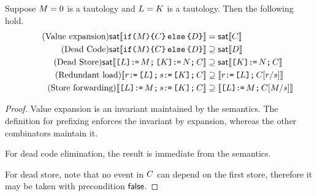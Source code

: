 \begin{lemma}
  Suppose $\aExp=0$ is a tautology and $\cExp=\dExp$ is a tautology.   Then the following hold.
  \begin{align*}
\tag{Value expansion}
  \fsat\sem{\IF{\aExp}\THEN\aCmd\ELSE\bCmd\FI} &=
  \fsat\sem{\aCmd}  \\
  \tag{Dead Code} 
  \fsat\sem{\IF{\aExp}\THEN\aCmd\ELSE\bCmd\FI} &\supseteq 
  \fsat\sem{\bCmd} \\
  \tag{Dead Store} 
  \fsat\sem{\REF{\cExp} \GETS \aExp \SEMI \REF{\dExp} \GETS \bExp \SEMI \aCmd} &\supseteq 
  \fsat\sem{\REF{\dExp} \GETS \bExp \SEMI \aCmd}\\    
  \tag{Redundant load}
  \sem{\aReg \GETS \REF{\cExp} \SEMI \bReg \GETS \REF{\dExp}  \SEMI \aCmd} &\supseteq
  \sem{\aReg \GETS \REF{\cExp} \SEMI \aCmd[\aReg/\bReg]} \\
  \tag{Store forwarding} 
  \sem{\REF{\cExp} \GETS \aExp \SEMI \bReg \GETS \REF{\dExp} \SEMI \aCmd} &\supseteq 
  \sem{\REF{\cExp} \GETS \aExp \SEMI \aCmd[\aExp/\bReg]}
\end{align*}
\begin{proof}
  Value expansion is an invariant maintained by the semantics.  The definition for prefixing enforces the invariant by expansion, whereas the other combinators maintain it.

  For dead code elimination, the result is immediate from the semantics.
  
  For dead store, note that no event in $\aCmd$ can depend on the first store,
  therefore it may be taken with precondition $\FALSE$.
  

\end{proof}
\end{lemma}
